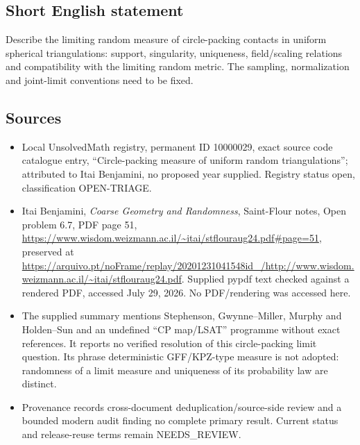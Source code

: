 \documentclass[11pt]{article}
\begin{document}
\subsection{Short English statement}
Describe the limiting random measure of circle-packing contacts in uniform spherical triangulations: support, singularity, uniqueness, field/scaling relations and compatibility with the limiting random metric. The sampling, normalization and joint-limit conventions need to be fixed.
\subsection{Sources}
\begin{itemize}
\item Local UnsolvedMath registry, permanent ID 10000029, exact source code catalogue entry, ``Circle-packing measure of uniform random triangulations''; attributed to Itai Benjamini, no proposed year supplied. Registry status open, classification OPEN-TRIAGE.
\item Itai Benjamini, \emph{Coarse Geometry and Randomness}, Saint-Flour notes, Open problem 6.7, PDF page 51, \url{https://www.wisdom.weizmann.ac.il/~itai/stflouraug24.pdf#page=51}, preserved at \url{https://arquivo.pt/noFrame/replay/20201231041548id_/http://www.wisdom.weizmann.ac.il/~itai/stflouraug24.pdf}. Supplied pypdf text checked against a rendered PDF, accessed July 29, 2026. No PDF/rendering was accessed here.
\item The supplied summary mentions Stephenson, Gwynne--Miller, Murphy and Holden--Sun and an undefined ``CP map/LSAT'' programme without exact references. It reports no verified resolution of this circle-packing limit question. Its phrase deterministic GFF/KPZ-type measure is not adopted: randomness of a limit measure and uniqueness of its probability law are distinct.
\item Provenance records cross-document deduplication/source-side review and a bounded modern audit finding no complete primary result. Current status and release-reuse terms remain NEEDS\_REVIEW.
\end{itemize}
\end{document}
